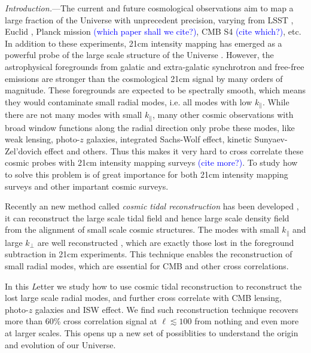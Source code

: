\documentclass[aps,prl,twocolumn,showpacs,superscriptaddress,groupedaddress,nofootinbib]{revtex4}  %
\newcommand{\tcb}{\textcolor{blue}}
\begin{document}
\pacs{}
\maketitle

{\it Introduction.}---The current and future cosmological observations aim
to map a large fraction of the Universe with unprecedent precision, varying
from LSST \cite{2009:lsst}, Euclid \cite{2011:euclid}\cite{2012:euclid}, 
Planck mission \tcb{(which paper shall we cite?)}, CMB S4 \tcb{(cite which?)}, 
etc. In addition to these
experiments, 21cm intensity mapping has emerged as a powerful probe of the 
large scale structure of the Universe \cite{2008:21cm}\cite{chang}.
However, the astrophysical foregrounds from galatic and extra-galatic 
synchrotron and free-free emissions are stronger than the cosmological 21cm 
signal by many orders of magnitude. These foregrounds are expected to be 
spectrally smooth, which means they would contaminate small radial
modes, i.e. all modes with low $k_\parallel$.
While there are not many modes with small $k_\parallel$, many other cosmic
observations with broad window functions along the radial direction only 
probe these modes, like weak lensing, photo-$z$ galaxies, 
integrated Sachs-Wolf effect, kinetic Sunyaev-Zel'dovich effect and others.  
Thus this makes it very hard to cross correlate these cosmic probes with 
21cm intensity mapping surveys 
\cite{2007ApJ...660.1030F}\cite{2008MNRAS.384..291A} \tcb{(cite more?)}. 
To study how to solve this problem is of great importance for both 21cm 
intensity mapping surveys and other impartant cosmic surveys.

Recently an new method called {\it cosmic tidal reconstruction} has been 
developed \cite{2012:pen}\cite{2015:zhu}, it can reconstruct the large scale 
tidal field and hence large scale density field from the alignment of small 
scale cosmic structures.
The modes with small $k_\parallel$ and large $k_\perp$ are well 
reconstructed \cite{2015:zhu}, which are exactly those lost in the foreground 
subtraction in 21cm experiments. 
This technique enables the reconstruction of small radial modes, which are 
essential for CMB and other cross correlations.

In this {\emph Letter} we study how to use cosmic tidal reconstruction to 
reconstruct the lost large scale radial modes, and further cross correlate with
CMB lensing, photo-$z$ galaxies and ISW effect. 
We find such reconstruction technique recovers more than 60\% cross correlation 
signal at $\ell\lesssim100$ from nothing and even more at larger scales. 
This opens up a new set of possiblities to understand the origin and evolution
of our Universe.
\end{document}
